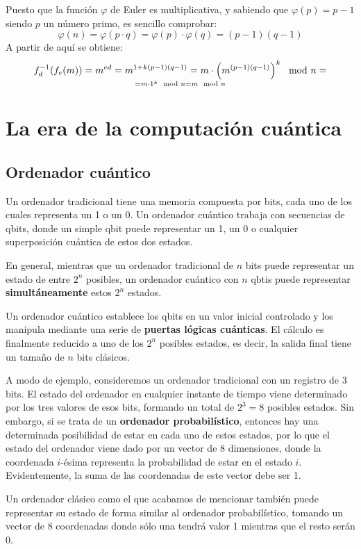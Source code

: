\documentclass[nochap]{apuntesURJC}
\begin{document}
Puesto que la función $\varphi$ de Euler es multiplicativa, y sabiendo que $\varphi(p)=p-1$ siendo $p$ un número primo, es sencillo comprobar:
\[\varphi(n) = \varphi(p\cdot q) = \varphi(p) \cdot \varphi(q) = (p-1)(q-1)\]
A partir de aquí se obtiene:
\[f_d^{-1}(f_e(m)) = m^{ed} = m^{1+k(p-1)(q-1)} = m \cdot \left(m^{(p-1)(q-1)}\right)^k\mod n = \atop = m \cdot 1^k \mod n = m \mod n\]

\section{La era de la computación cuántica}
\subsection{Ordenador cuántico}
Un ordenador tradicional tiene una memoria compuesta por bits, cada uno de los cuales representa un 1 o un 0. Un ordenador cuántico trabaja con secuencias de qbits, donde un simple qbit puede representar un 1, un 0 o cualquier superposición cuántica de estos dos estados.

En general, mientras que un ordenador tradicional de $n$ bits puede representar un estado de entre $2^n$ posibles, un ordenador cuántico con $n$ qbtis puede representar \textbf{simultáneamente} estos $2^n$ estados.

Un ordenador cuántico establece los qbits en un valor inicial controlado y los manipula mediante una serie de \textbf{puertas lógicas cuánticas}. El cálculo es finalmente reducido a uno de los $2^n$ posibles estados, es decir, la salida final tiene un tamaño de $n$ bits clásicos.

A modo de ejemplo, consideremos un ordenador tradicional con un registro de 3 bits. El estado del ordenador en cualquier instante de tiempo viene determinado por los tres valores de esos bits, formando un total de $2^3=8$ posibles estados. Sin embargo, si se trata de un \textbf{ordenador probabilístico}, entonces hay una determinada posibilidad de estar en cada uno de estos estados, por lo que el estado del ordenador viene dado por un vector de 8 dimensiones, donde la coordenada $i$-ésima representa la probabilidad de estar en el estado $i$. Evidentemente, la suma de las coordenadas de este vector debe ser 1.

Un ordenador clásico como el que acabamos de mencionar también puede representar su estado de forma similar al ordenador probabilístico, tomando un vector de 8 coordenadas donde sólo una tendrá valor 1 mientras que el resto serán 0.
\end{document}
